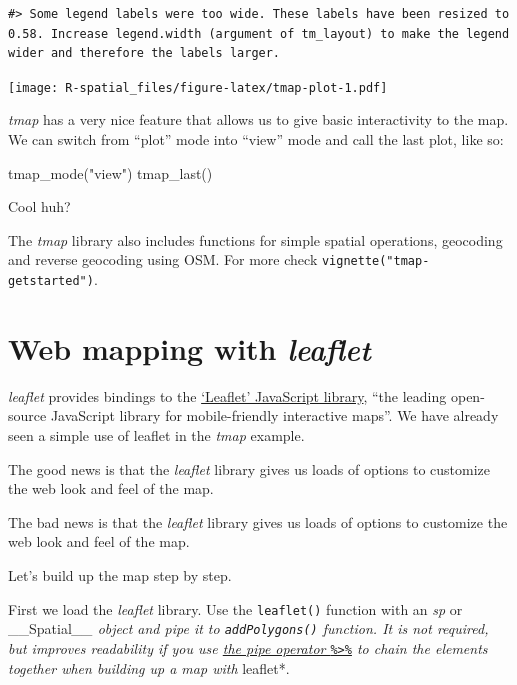 \documentclass[
  11pt,
]{book}
\newenvironment{Shaded}{\begin{snugshade}}{\end{snugshade}}
\newcommand{\FunctionTok}[1]{\textcolor[rgb]{0.00,0.00,0.00}{#1}}
\newcommand{\NormalTok}[1]{#1}
\newcommand{\StringTok}[1]{\textcolor[rgb]{0.31,0.60,0.02}{#1}}
\begin{document}
\begin{verbatim}
#> Some legend labels were too wide. These labels have been resized to 0.58. Increase legend.width (argument of tm_layout) to make the legend wider and therefore the labels larger.
\end{verbatim}

\texttt{[image: R-spatial\_files/figure-latex/tmap-plot-1.pdf]}

\emph{tmap} has a very nice feature that allows us to give basic interactivity to the map. We can switch from ``plot'' mode into ``view'' mode and call the last plot, like so:

\begin{Shaded}
\begin{Highlighting}[]
\FunctionTok{tmap\_mode}\NormalTok{(}\StringTok{"view"}\NormalTok{)}
\FunctionTok{tmap\_last}\NormalTok{()}
\end{Highlighting}
\end{Shaded}

Cool huh?

The \emph{tmap} library also includes functions for simple spatial operations, geocoding and reverse geocoding using OSM. For more check \texttt{vignette("tmap-getstarted")}.

\hypertarget{web-mapping-with-leaflet}{%
\section{\texorpdfstring{Web mapping with \emph{leaflet}}{Web mapping with leaflet}}\label{web-mapping-with-leaflet}}

\emph{leaflet} provides bindings to the \href{http://leafletjs.com}{`Leaflet' JavaScript library}, ``the leading open-source JavaScript library for mobile-friendly interactive maps''. We have already seen a simple use of leaflet in the \emph{tmap} example.

The good news is that the \emph{leaflet} library gives us loads of options to customize the web look and feel of the map.

The bad news is that the \emph{leaflet} library gives us loads of options to customize the web look and feel of the map.

Let's build up the map step by step.

First we load the \emph{leaflet} library. Use the \texttt{leaflet()} function with an \emph{sp} or \_\_Spatial\emph{\_\_ object and pipe it to \texttt{addPolygons()} function. It is not required, but improves readability if you use \href{https://github.com/tidyverse/magrittr}{the pipe operator \texttt{\%\textgreater{}\%}} to chain the elements together when building up a map with }leaflet*.
\end{document}
